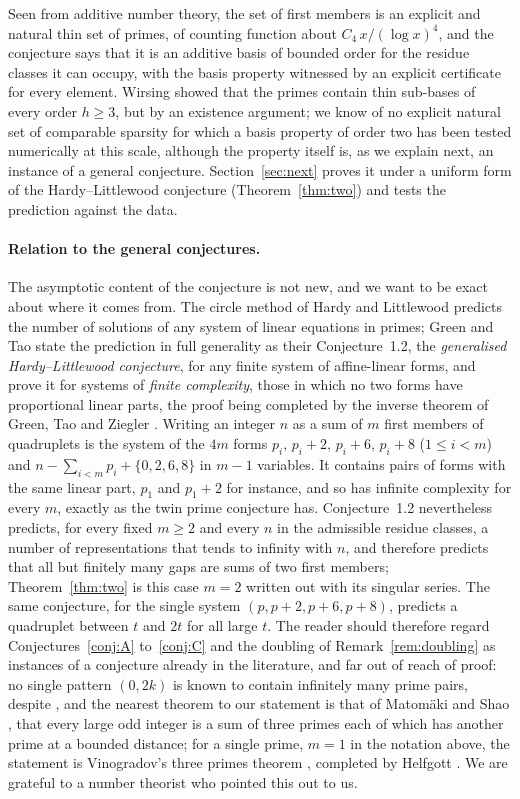 \documentclass[11pt,a4paper]{article}
\begin{document}
Seen from additive number theory, the set of first members is an explicit
and natural thin set of primes, of counting function about
$C_4\,x/(\log x)^4$, and the conjecture says that it is an additive basis
of bounded order for the residue classes it can occupy, with the basis
property witnessed by an explicit certificate for every element. Wirsing
\cite{Wirsing1986} showed that the primes contain thin sub-bases of every
order $h\ge3$, but by an existence argument; we know of no explicit natural
set of comparable sparsity for which a basis property of order two has been
tested numerically at this scale, although the property itself is, as we
explain next, an instance of a general conjecture. Section~\ref{sec:next}
proves it under a uniform form of the Hardy--Littlewood conjecture
(Theorem~\ref{thm:two}) and tests the prediction against the data.

\paragraph{Relation to the general conjectures.}
The asymptotic content of the conjecture is not new, and we want to be exact
about where it comes from. The circle method of Hardy and Littlewood predicts
the number of solutions of any system of linear equations in primes; Green and
Tao \cite{GreenTao2010} state the prediction in full generality as their
Conjecture~1.2, the \emph{generalised Hardy--Littlewood conjecture}, for any
finite system of affine-linear forms, and prove it for systems of \emph{finite
complexity}, those in which no two forms have proportional linear parts, the
proof being completed by the inverse theorem of Green, Tao and Ziegler
\cite{GreenTaoZiegler2012}. Writing an integer $n$ as a sum of $m$ first
members of quadruplets is the system of the $4m$ forms
$p_i,\,p_i+2,\,p_i+6,\,p_i+8$ ($1\le i<m$) and $n-\sum_{i<m}p_i+\{0,2,6,8\}$
in $m-1$ variables. It contains pairs of forms with the same linear part,
$p_1$ and $p_1+2$ for instance, and so has infinite complexity for every $m$,
exactly as the twin prime conjecture has. Conjecture~1.2 nevertheless
predicts, for every fixed $m\ge2$ and every $n$ in the admissible residue
classes, a number of representations that tends to infinity with $n$, and
therefore predicts that all but finitely many gaps are sums of two first
members; Theorem~\ref{thm:two} is this case $m=2$ written out with its
singular series. The same conjecture, for the single system
$(p,p+2,p+6,p+8)$, predicts a quadruplet between $t$ and $2t$ for all
large $t$. The reader should therefore regard Conjectures~\ref{conj:A}
to~\ref{conj:C} and the doubling of Remark~\ref{rem:doubling} as instances
of a conjecture already in the literature, and far out of reach of proof: no
single pattern $(0,2k)$ is known to contain infinitely many prime pairs,
despite \cite{Zhang2014,Maynard2015}, and the nearest theorem to our
statement is that of Matom\"aki and Shao \cite{MatomakiShao2017}, that
every large odd integer is a sum of three primes each of which has another
prime at a bounded distance; for a single prime, $m=1$ in the notation
above, the statement is Vinogradov's three primes theorem
\cite{Vinogradov1937}, completed by Helfgott \cite{Helfgott2013}. We are
grateful to a number theorist who pointed this out to us.
\end{document}
